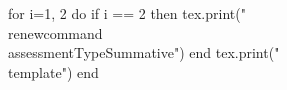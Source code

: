 \documentclass[twoside, 10pt]{article}
\title{}
\date{}
\newcommand{\assessmentType}{Formative}
\newcommand{\template}{
\directlua{tex.print(utils.genVersion())}
\noindent
{\large
First Name \rule{8em}{.4pt}\hspace{\stretch{1}} Last Name \rule{8em}{.4pt}\hspace{\stretch{1}} Date \rule{1.5em}{.4pt} -- \rule{1.5em}{.4pt} -- \rule{1.5em}{.4pt}\hspace{\stretch{1}} Period \rule{2em}{.4pt}\hspace{\stretch{1}}
}
\vspace{1em}

\noindent
\renewcommand{\arraystretch}{2}
\begin{tabular}{|l|l|l|}
\hline
\textbf{ARGUE}&\textbf{MODEL}&\textbf{BE PRECISE}\\
\hline
&&\\
\hline
\end{tabular}

\begin{enumerate}
\section*{\normalsize Be Precise.}
 \item Write the expression in standard form:
$
 (\directlua{tex.print(utils.genRandom(-10,10, false, true, true))} x \directlua{tex.print(utils.genRandom(-10,10, true, true, true))} x^3\directlua{tex.print(utils.genRandom(-10,10, true, true, true))}x^2 ) - (\directlua{tex.print(utils.genRandom(-10,10, false, true, true))}x^2  \directlua{tex.print(utils.genRandom(-10,10, true, true, true))} x \directlua{tex.print(utils.genRandom(-10,10, true, false, true))} )
$
\vspace{2em}

\rule{20em}{0.4pt}
 \item Write the expression in standard form: $(x \directlua{tex.print(utils.genRandom(-10,10, true, false, true))})(x \directlua{tex.print(utils.genRandom(-10,10, true, false, true))})$
 \vspace{2em}

\rule{20em}{0.4pt}
 \item Write a polynomial given the following conditions:
\begin{itemize}
\item
the degree of the expression is \directlua{tex.print(utils.genRandom(3, 8))}
\item 
the leading coefficient is \directlua{tex.print(utils.genRandom(-99, 99, false, false, true))}
\item the constant term is \directlua{tex.print(utils.genRandom(-99, 99, false, false, false))}
\item it has exactly three terms
\end{itemize}
\vspace{2em}

\rule{20em}{0.4pt}
\section*{\normalsize Model. }
\item Suppose the sum of two numbers is $\directlua{tex.print(utils.genRandom(-100, 100))}$. Denote one of the numbers by $x$.
\begin{enumerate}
\item Write an expression for the product of these two numbers, $P(x)$. \textbf{Show your reasoning.}
\vspace{\stretch{1}}
\item What is the product of the two numbers when $x=\directlua{tex.print(utils.genRandom(-50, 50))}$. \textbf{Show your reasoning.}
\vspace{\stretch{1}}
\item What is the reasonable domain of $P(x)$? \textbf{Show your reasoning.}
\vspace{\stretch{1}}
\end{enumerate}
\clearpage
\section*{\normalsize Argue. }
\item \directlua{a = utils.genRandom(-5,5); b = utils.genRandom(-5,5, false, false, -a);} Solve $x^2\directlua{tex.print(utils.normalizeCoeff(a+b, true))}x\directlua{tex.print(utils.normalizeCoeff(a*b, true))} =0$ for $x$. Show all your work!
\begin{enumerate}[label = \textbf{Step \arabic*:}, leftmargin=*]
\item
Find two numbers $u$ and $v$ such that $u\cdot v = \directlua{tex.print(utils.normalizeCoeff(a*b, false))}$ and $u + v =  \directlua{tex.print(utils.normalizeCoeff(a+b, false))}$
\vspace{\stretch{1}}
\item Use the result in Step 1 to factor the polynomial of the left.
\vspace{\stretch{1}}
\item Use the factorization in Step 2 to determine the solutions of the equations.
\vspace{\stretch{1}}
\end{enumerate}
\item  Solve $ \directlua{tex.print(utils.genRandom(2,10))}\left( \directlua{tex.print(utils.genRandom(2,10))}\right)^{ \directlua{tex.print(utils.genRandom(-10,10, false, true, true))}x} =  \directlua{tex.print(utils.genRandom(1,20))}$ for $x$. \textbf{Show your work, and express your answer in exact form through mathematics notation. No decimal.}
\begin{enumerate}[label = \textbf{Step \arabic*:}, leftmargin=*]
\item
Isolate the exponential function of $x$ on one side of the equation.
\vspace{\stretch{1}}
\item Apply a logarithm of an appropriate base on both sides of the equation.
\vspace{\stretch{1}}
\item Solve the resulted linear equation from the last step.
\vspace{\stretch{1}}
\end{enumerate}
\end{enumerate}
\clearpage
}
\begin{document}
\begin{luacode*}
for i=1, 2 do
	if i == 2 then
		tex.print("\\renewcommand{\\assessmentType}{Summative}")
	end
	tex.print("\\template")
end
\end{luacode*}
\end{document}
